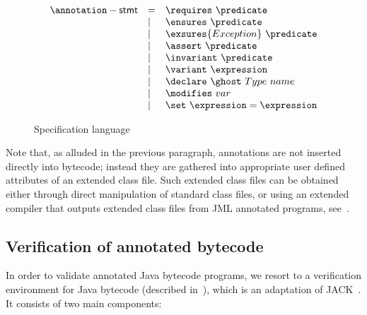\begin{figure}
$$
\begin{array}{lll} 
\mbox{\annotation}-{\sf stmt} & = &
                                       \requires \ \predicate \\
                              & \mid & \ensures  \ \predicate  \\
                           & \mid  & \exsures{Exception} \ \predicate  \\
                               & \mid  &  \assert  \ \predicate  \\
                                & \mid & \invariant \  \predicate  \\
                                & \mid & \variant \  \expression  \\
                                & \mid &  \declare \ \ghost \ Type \ name \\
                                 & \mid & \modifies  \ var  \\
                                 & \mid & \set \ \expression = \expression

\end{array}
$$
\caption{{\sc Specification language}}\label{fig:bml}
\end{figure}

Note that, as alluded in the previous paragraph, annotations are not
inserted directly into bytecode; instead they are gathered into
appropriate user defined attributes of an extended class file. Such
extended class files can be obtained either through direct
manipulation of standard class files, or using an extended compiler
that outputs extended class files from JML annotated programs,
see~\cite{LM05:acc}.

\subsection{Verification of annotated bytecode}
In order to validate annotated Java bytecode programs, we resort to a
verification environment for Java bytecode (described in~\cite{LM05:acc}), which is an adaptation of JACK~\cite{BRL03:fme}. It consists of two main components:


